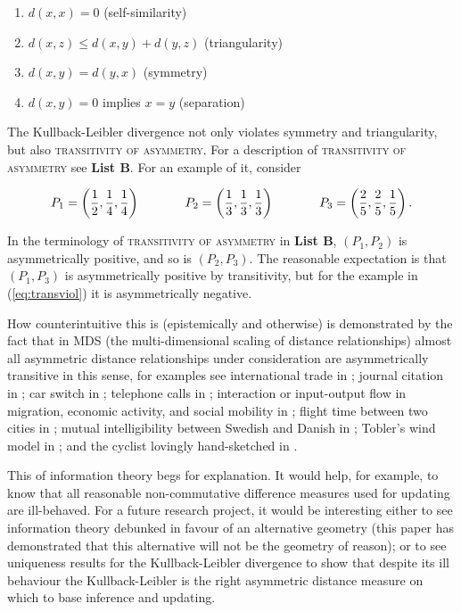 \documentclass[12pt]{article}
\begin{document}
\begin{enumerate}[(m1)]
\item $d(x,x)=0$ (self-similarity)
\item $d(x,z)\leq{}d(x,y)+d(y,z)$ (triangularity)
\item $d(x,y)=d(y,x)$ (symmetry)
\item $d(x,y)=0$ implies $x=y$ (separation)
\end{enumerate}

The Kullback-Leibler divergence not only violates symmetry and
triangularity, but also \textsc{transitivity of asymmetry}. For a
description of \textsc{transitivity of asymmetry} see \textbf{List B}.
For an example of it, consider

\begin{equation}
  \label{eq:transviol}
    P_{1}=\left(\frac{1}{2},\frac{1}{4},\frac{1}{4}\right)  \hspace{.5in}
    P_{2}=\left(\frac{1}{3},\frac{1}{3},\frac{1}{3}\right) \hspace{.5in}
    P_{3}=\left(\frac{2}{5},\frac{2}{5},\frac{1}{5}\right).
\end{equation}

In the terminology of \textsc{transitivity of asymmetry} in \textbf{List B},
$(P_{1},P_{2})$ is asymmetrically positive, and so is $(P_{2},P_{3})$.
The reasonable expectation is that $(P_{1},P_{3})$ is asymmetrically
positive by transitivity, but for the example in (\ref{eq:transviol})
it is asymmetrically negative.

How counterintuitive this is (epistemically and otherwise) is
demonstrated by the fact that in MDS (the multi-dimensional scaling of
distance relationships) almost all asymmetric distance relationships
under consideration are asymmetrically transitive in this sense, for
examples see international trade in ; journal
citation in ; car switch in
; telephone calls in
; interaction or input-output flow in
migration, economic activity, and social mobility in
; flight time between two cities in
; mutual intelligibility between Swedish
and Danish in ; Tobler's wind model in
; and the cyclist lovingly hand-sketched in
.

This  of information theory begs for explanation.
It would help, for example, to know that all reasonable
non-commutative difference measures used for updating are ill-behaved.
For a future research project, it would be interesting either to see
information theory debunked in favour of an alternative geometry (this
paper has demonstrated that this alternative will not be the geometry
of reason); or to see uniqueness results for the Kullback-Leibler
divergence to show that despite its ill behaviour the Kullback-Leibler
is the right asymmetric distance measure on which to base inference
and updating.
\end{document}
